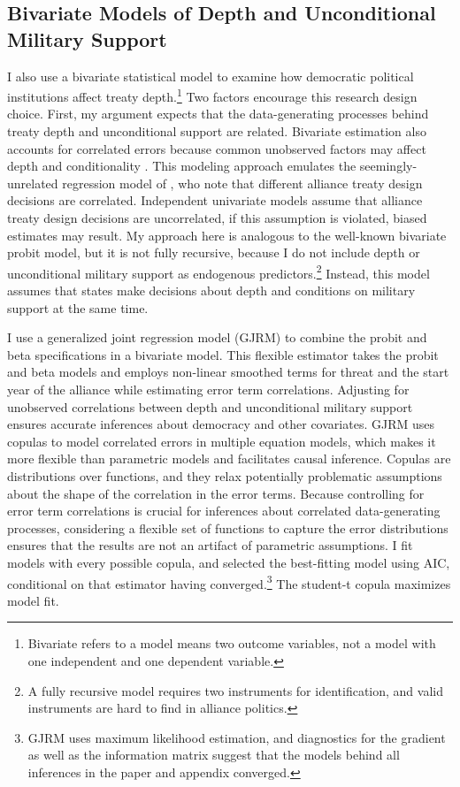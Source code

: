 \documentclass[12pt]{article}
\begin{document}
\subsection{Bivariate Models of Depth and Unconditional Military Support}


I also use a bivariate statistical model to examine how democratic political institutions affect treaty depth.\footnote{Bivariate refers to a model means two outcome variables, not a model with one independent and one dependent variable.} 
Two factors encourage this research design choice. 
First, my argument expects that the data-generating processes behind treaty depth and unconditional support are related. 
Bivariate estimation also accounts for correlated errors because common unobserved factors may affect depth and conditionality \citep{Braumoelleretal2018}.
This modeling approach emulates the seemingly-unrelated regression model of \citet{FjelstulReiter2019}, who note that different alliance treaty design decisions are correlated. 
Independent univariate models assume that alliance treaty design decisions are uncorrelated, if this assumption is violated, biased estimates may result. 
My approach here is analogous to the well-known bivariate probit model, but it is not fully recursive, because I do not include depth or unconditional military support as endogenous predictors.\footnote{A fully recursive model requires two instruments for identification, and valid instruments are hard to find in alliance politics.}  
Instead, this model assumes that states make decisions about depth and conditions on military support at the same time. 



I use a generalized joint regression model (GJRM) \citep{Braumoelleretal2018} to combine the probit and beta specifications in a bivariate model.
This flexible estimator takes the probit and beta models and employs non-linear smoothed terms for threat and the start year of the alliance while estimating error term correlations. 
Adjusting for unobserved correlations between depth and unconditional military support ensures accurate inferences about democracy and other covariates.
GJRM uses copulas to model correlated errors in multiple equation models, which makes it more flexible than parametric models and facilitates causal inference. 
Copulas are distributions over functions, and they relax potentially problematic assumptions about the shape of the correlation in the error terms. 
Because controlling for error term correlations is crucial for inferences about correlated data-generating processes, considering a flexible set of functions to capture the error distributions ensures that the results are not an artifact of parametric assumptions. 
I fit models with every possible copula, and selected the best-fitting model using AIC, conditional on that estimator having converged.\footnote{GJRM uses maximum likelihood estimation, and diagnostics for the gradient as well as the information matrix suggest that the models behind all inferences in the paper and appendix converged.} 
The student-t copula maximizes model fit. 
\end{document}
